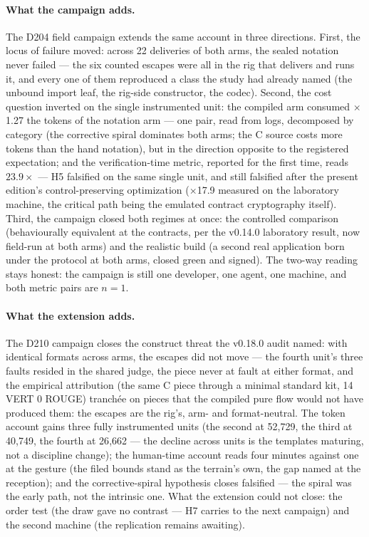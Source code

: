 \documentclass[11pt,a4paper]{article}
\begin{document}
\paragraph{What the campaign adds.}
The D204 field campaign extends the same account in three directions.
First, the locus of failure moved: across 22 deliveries of both arms,
the sealed notation never failed --- the six counted escapes were all
in the rig that delivers and runs it, and every one of them reproduced
a class the study had already named (the unbound import leaf, the
rig-side constructor, the codec). Second, the cost question inverted
on the single instrumented unit: the compiled arm consumed
$\times$1.27 the tokens of the notation arm --- one pair, read from
logs, decomposed by category (the corrective spiral dominates both
arms; the C source costs more tokens than the hand notation), but in
the direction opposite to the registered expectation;
and the verification-time metric, reported for the first time, reads
$23.9\times$ --- H5 falsified on the same single unit, and still
falsified after the present edition's control-preserving optimization
($\times$17.9 measured on the laboratory machine, the critical path
being the emulated contract cryptography itself). Third, the
campaign closed both regimes at once: the controlled comparison
(behaviourally equivalent at the contracts, per the v0.14.0
laboratory result, now field-run at both arms) and the realistic
build (a second real application born under the protocol at both
arms, closed green and signed). The two-way reading stays honest: the
campaign is still one developer, one agent, one machine, and both
metric pairs are $n{=}1$.

\paragraph{What the extension adds.} The D210 campaign closes the
construct threat the v0.18.0 audit named: with identical formats
across arms, the escapes did not move --- the fourth unit's three
faults resided in the shared judge, the piece never at fault at either
format, and the empirical attribution (the same C piece through a
minimal standard kit, 14 VERT 0 ROUGE) tranch\'ee on pieces that the
compiled pure flow would not have produced them: the escapes are the
rig's, arm- and format-neutral. The token account gains three fully
instrumented units (the second at 52{,}729, the third at 40{,}749,
the fourth at 26{,}662 --- the decline across units is the templates
maturing, not a discipline change); the human-time account reads
four minutes against one at the gesture (the filed bounds stand as
the terrain's own, the gap named at the reception); and the
corrective-spiral hypothesis closes falsified --- the spiral was the
early path, not the intrinsic one. What the extension could not
close: the order test (the draw gave no contrast --- H7 carries to
the next campaign) and the second machine (the replication remains
awaiting).
\end{document}
